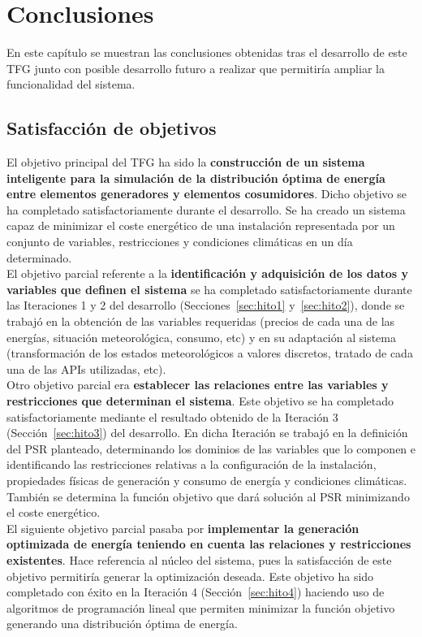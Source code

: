 \chapter{Conclusiones}
\label{cap:Conclusiones}
En este capítulo se muestran las conclusiones obtenidas tras el desarrollo de este \gls{TFG} junto con posible desarrollo futuro a realizar que permitiría ampliar la funcionalidad del sistema.\\
\section{Satisfacción de objetivos}
El objetivo principal del \gls{TFG} ha sido la \textbf{construcción de un sistema inteligente para la simulación de la distribución óptima de energía entre elementos generadores y elementos cosumidores}. Dicho objetivo se ha completado satisfactoriamente durante el desarrollo. Se ha creado un sistema capaz de minimizar el coste energético de una instalación representada por un conjunto de variables, restricciones y condiciones climáticas en un día determinado.\\

El objetivo parcial referente a la \textbf{identificación y adquisición de los datos y variables que definen el sistema} se ha completado satisfactoriamente durante las Iteraciones 1 y 2 del desarrollo (Secciones~\ref{sec:hito1} y~\ref{sec:hito2}), donde se trabajó en la obtención de las variables requeridas (precios de cada una de las energías, situación meteorológica, consumo, etc) y en su adaptación al sistema (transformación de los estados meteorológicos a valores discretos, tratado de cada una de las APIs utilizadas, etc).\\

Otro objetivo parcial era \textbf{establecer las relaciones entre las variables y restricciones que determinan el sistema}. Este objetivo se ha completado satisfactoriamente mediante el resultado obtenido de la Iteración 3 (Sección~\ref{sec:hito3}) del desarrollo. En dicha Iteración se trabajó en la definición del \gls{PSR} planteado, determinando los dominios de las variables que lo componen e identificando las restricciones relativas a la configuración de la instalación, propiedades físicas de generación y consumo de energía y condiciones climáticas. También se determina la función objetivo que dará solución al \gls{PSR} minimizando el coste energético.\\

El siguiente objetivo parcial pasaba por \textbf{implementar la generación optimizada de energía teniendo en cuenta las relaciones y restricciones existentes}. Hace referencia al núcleo del sistema, pues la satisfacción de este objetivo permitiría generar la optimización deseada. Este objetivo ha sido completado con éxito en la Iteración 4 (Sección~\ref{sec:hito4}) haciendo uso de algoritmos de programación lineal que permiten minimizar la función objetivo generando una distribución óptima de energía.\\

